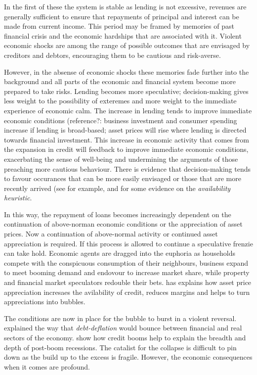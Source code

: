 \documentclass[12pt, a4paper, oneside]{article} %
\begin{document}
In the first of these the system is stable as lending is not excessive, revenues are generally sufficient to ensure that repayments of principal and interest can be made from current income.  This period may be framed by memories of past financial crisis and the economic hardships that are associated with it.  Violent economic shocks are among the range of possible outcomes that are envisaged by creditors and debtors, encouraging them to be cautious and risk-averse. 

However, in the absense of economic shocks these memories fade further into the background and all parts of the economic and financial system become more prepared to take risks.  Lending becomes more speculative; decision-making gives less weight to the possibility of exteremes and more weight to the immediate experience of economic calm.  The increase in lending tends to improve immediate economic conditions (reference?:  business investment and consumer spending increase if lending is broad-based; asset prices will rise where lending is directed towards financial investment.  This increase in economic activity that comes from the expansion in credit will feedback to improve immediate economic conditions, exacerbating the sense of well-being and undermining the arguments of those preaching more cautious behaviour.  There is evidence that decision-making tends to favour occurances that can be more easily envisaged or those that are more recently arrived (see for example, \citet{KTAvailability} and \citet{Schwartzavailability} for some evidence on the \emph{availability heuristic}.   

In this way, the repayment of loans becomes increasingly dependent on the continuation of above-norman economic conditions or the appreciation of asset prices. Now a continuation of above-normal activity or continued asset appreciation is required. If this process is allowed to continue a speculative frenzie can take hold.  Economic agents are dragged into the euphoria as households compete with the conspicuous consumption of their neighbours, business expand to meet booming demand and endovour to increase market share, while property and financial market speculators redouble their bets.  \citet{BrunnermeierLiquidity} has explains how asset price appreciation incresaes the avilability of credit, reduces margins and helps to turn appreciations into bubbles. 

The conditions are now in place for the bubble to burst in a violent reversal.  \citet{FisherBD, FisherDD} explained the way that \emph{debt-deflation} would bounce between financial and real sectors of the economy.    \citet{ReinhartRogoff} show how credit booms help to explain the breadth and depth of post-boom recessions.  The catalist for the collapse is difficult to pin down as the build up to the excess is fragile.  However, the economic consequences when it comes are profound.  
\end{document}

